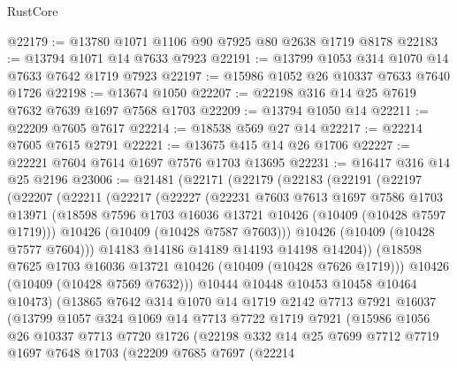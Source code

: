 \begin{lexlean}{RustCore}
\begin{coremodule}
@22179 := @13780 @1071 @1106 @90 @7925 @80 @2638 @1719 @8178
@22183 := @13794 @1071 @14 @7633 @7923
@22191 := @13799 @1053 @314 @1070 @14 @7633 @7642 @1719 @7923
@22197 := @15986 @1052 @26 @10337 @7633 @7640 @1726
@22198 := @13674 @1050
@22207 := @22198 @316 @14 @25 @7619 @7632 @7639 @1697 @7568 @1703
@22209 := @13794 @1050 @14
@22211 := @22209 @7605 @7617
@22214 := @18538 @569 @27 @14
@22217 := @22214 @7605 @7615 @2791
@22221 := @13675 @415 @14 @26 @1706
@22227 := @22221 @7604 @7614 @1697 @7576 @1703 @13695
@22231 := @16417 @316 @14 @25 @2196
@23006 := @21481
    (@22171
      (@22179
        (@22183
          (@22191
            (@22197
              (@22207
                (@22211
                  (@22217
                    (@22227
                      (@22231
                        @7603
                        @7613
                        @1697
                        @7586
                        @1703
                        @13971
                        (@18598 @7596 @1703 @16036 @13721 @10426 (@10409 (@10428 @7597 @1719)))
                        @10426
                        (@10409 (@10428 @7587 @7603)))
                      @10426
                      (@10409 (@10428 @7577 @7604)))
                    @14183
                    @14186
                    @14189
                    @14193
                    @14198
                    @14204))
                (@18598 @7625 @1703 @16036 @13721 @10426 (@10409 (@10428 @7626 @1719)))
                @10426
                (@10409 (@10428 @7569 @7632)))
              @10444
              @10448
              @10453
              @10458
              @10464
              @10473)
            (@13865
              @7642
              @314
              @1070
              @14
              @1719
              @2142
              @7713
              @7921
              @16037
              (@13799
                @1057
                @324
                @1069
                @14
                @7713
                @7722
                @1719
                @7921
                (@15986
                  @1056
                  @26
                  @10337
                  @7713
                  @7720
                  @1726
                  (@22198
                    @332
                    @14
                    @25
                    @7699
                    @7712
                    @7719
                    @1697
                    @7648
                    @1703
                    (@22209
                      @7685
                      @7697
                      (@22214

\end{coremodule}
\end{lexlean}
